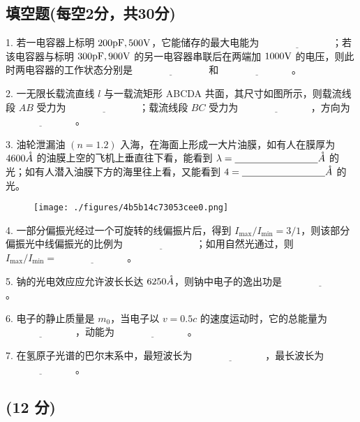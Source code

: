 \subsection{填空题(每空2分，共30分)}
1. 若一电容器上标明 $200 \\ \text{pF}, \\ 500 \\ \text{V}$，它能储存的最大电能为 $\underline{\hspace{3cm}}$；若该电容器与标明 $300 \\ \text{pF}, \\ 900 \\ \text{V}$ 的另一电容器串联后在两端加 $1000 \\ \text{V}$ 的电压，则此时两电容器的工作状态分别是 $\underline{\hspace{3cm}}$ 和 $\underline{\hspace{3cm}}$。

2. 一无限长载流直线 $l$ 与一载流矩形 ABCDA 共面，其尺寸如图所示，则载流线段 $AB$ 受力为 $\underline{\hspace{3cm}}$；载流线段 $BC$ 受力为 $\underline{\hspace{3cm}}$，方向为 $\underline{\hspace{3cm}}$。

3. 油轮泄漏油 $(n = 1.2)$ 入海，在海面上形成一大片油膜，如有人在膜厚为 $4600 \\ \mathring{A}$ 的油膜上空的飞机上垂直往下看，能看到 $\lambda= \underline{\hspace{3cm}}\\ \mathring{A}$ 的光；如有人潜入油膜下方的海里往上看，又能看到 $4 = \underline{\hspace{3cm}}\\ \mathring{A}$ 的光。
\begin{figure}[ht]
\centering
\texttt{[image: ./figures/4b5b14c73053cee0.png]}
\caption{} \label{fig_NJU08_2}
\end{figure}

4. 一部分偏振光经过一个可旋转的线偏振片后，得到 $I_{\max} / I_{\min} = 3 / 1$，则该部分偏振光中线偏振光的比例为 $\underline{\hspace{3cm}}$；如用自然光通过，则 $I_{\max} / I_{\min} = \underline{\hspace{3cm}}$。

5. 钠的光电效应应允许波长长达 $6250 \\ \mathring{A}$，则钠中电子的逸出功是 $\underline{\hspace{3cm}}$。

6. 电子的静止质量是 $m_0$，当电子以 $v = 0.5c$ 的速度运动时，它的总能量为 $\underline{\hspace{3cm}}$，动能为 $\underline{\hspace{3cm}}$。

7. 在氢原子光谱的巴尔末系中，最短波长为 $\underline{\hspace{3cm}}$，最长波长为 $\underline{\hspace{3cm}}$。
\subsection{(12 分)}
